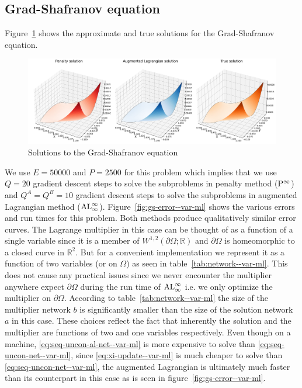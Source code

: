 \subsection{Grad-Shafranov equation}
Figure~\ref{fig:gs-surface--var-ml} shows the approximate and true solutions for the Grad-Shafranov equation.
\begin{figure}[!ht]
    \centering
\includegraphics[scale=0.32]{var-ml/plots/var-plots-Grad-Shafranov-surface.png}
    \caption{Solutions to the Grad-Shafranov equation}
    \label{fig:gs-surface--var-ml}
\end{figure}
We use $E=50000$ and $P=2500$ for this problem which implies that we use $Q=20$ gradient descent steps to solve the subproblems in penalty method (${\rm P}^\infty$) and $Q^A=Q^B=10$ gradient descent steps to solve the subproblems in augmented Lagrangian method (${\rm AL}^\infty_\infty$). Figure~\ref{fig:gs-error--var-ml} shows the various errors and run times for this problem. Both methods produce qualitatively similar error curves. The Lagrange multiplier in this case can be thought of as a function of a single variable since it is a member of $W^{1,2}(\partial\Omega;\mathbb R)$ and $\partial\Omega$ is homeomorphic to a closed curve in $\mathbb R^2$. But for a convenient implementation we represent it as a function of two variables (or on $\Omega$) as seen in table~\ref{tab:network--var-ml}. This does not cause any practical issues since we never encounter the multiplier anywhere expect $\partial \Omega$ during the run time of ${\rm AL}^\infty_\infty$ i.e. we only optimize the multiplier on $\partial\Omega$. According to table~\ref{tab:network--var-ml} the size of the multiplier network $b$ is significantly smaller than the size of the solution network $a$ in this case. These choices reflect the fact that inherently the solution and the multiplier are functions of two and one variables respectively. Even though on a machine, \eqref{eq:seq-uncon-al-net--var-ml} is more expensive to solve than \eqref{eq:seq-uncon-net--var-ml}, since \eqref{eq:xi-update--var-ml} is much cheaper to solve than \eqref{eq:seq-uncon-net--var-ml}, the augmented Lagrangian is ultimately much faster than its counterpart in this case as is seen in figure~\ref{fig:gs-error--var-ml}. 
